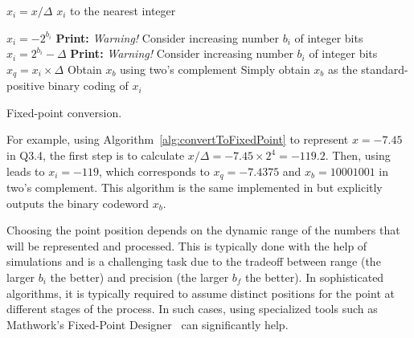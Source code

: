 \begin{algorithm}[htb]
{
 	$x_i = x / \Delta$ 
		{
      $x_i$ to the nearest integer 
     }

		{
     $x_i = -2^{b_i}$ 
     \textbf{Print: } \emph{Warning!} Consider increasing number $b_i$ of integer bits
     }
		{
     $x_i = 2^{b_i} - \Delta$ 
     \textbf{Print: } \emph{Warning!} Consider increasing number $b_i$ of integer bits
    }
	$x_q = x_i \times \Delta$ 
		{
		 Obtain $x_b$ using two's complement 
		}
		{
		 Simply obtain $x_b$ as the standard-positive binary coding of $x_i$		
		}    
}
\caption{Fixed-point conversion.\label{alg:convertToFixedPoint}}
\end{algorithm}

For example, using Algorithm~\ref{alg:convertToFixedPoint} to represent $x=-7.45$ in Q3.4, the first step is to calculate $x / \Delta = -7.45 \times 2^4 = -119.2$. Then, using  leads to $x_i=-119$, which corresponds to $x_q=-7.4375$ and $x_b=1000 1001$ in two's complement. This algorithm is the same implemented in  but explicitly outputs the binary codeword $x_b$.

Choosing the point position depends on the dynamic range of the numbers that will be represented and processed. This is typically done with the help of simulations and is a challenging task due to the tradeoff between range (the larger $b_i$ the better) and precision (the larger $b_f$ the better). In sophisticated algorithms, it is typically  required to assume distinct positions for the point at different stages of the process. In such cases, using specialized tools such as Mathwork's Fixed-Point Designer~ can significantly help.

